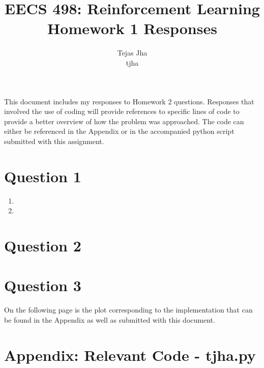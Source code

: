\documentclass[11pt]{article}
\title{EECS 498: Reinforcement Learning \protect \\ Homework 1 Responses}
\author{Tejas Jha \\ tjha}
\begin{document}
\maketitle
This document includes my responses to Homework 2 questions. Responses that involved the use of coding will provide references to specific lines of code to provide a better overview of how the problem was approached. The code can either be referenced in the Appendix or in the accompanied python script submitted with this assignment.

\section*{Question 1}
\begin{enumerate}[label=(\alph*)]
\item
\item

\end{enumerate}


\section*{Question 2}


\section*{Question 3}

On the following page is the plot corresponding to the implementation that can be found in the Appendix as well as submitted with this document.\\

\clearpage





   \begin{figure}
       \noindent{}
    \end{figure}


\clearpage

\section*{Appendix: Relevant Code - tjha.py}
   
\end{document}
